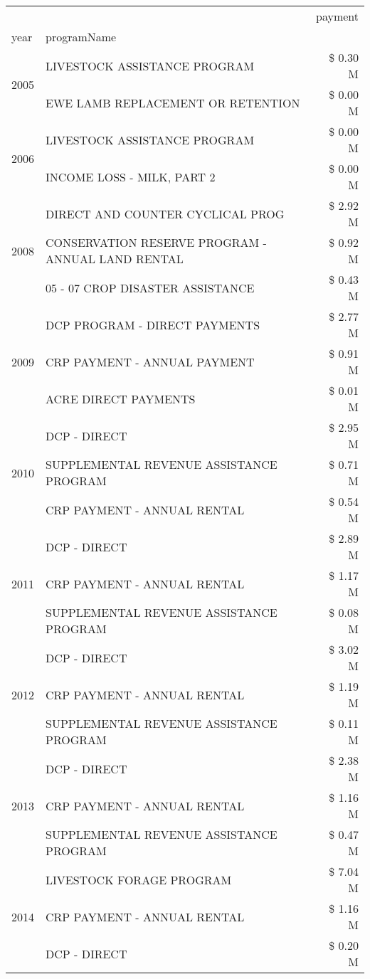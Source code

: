 \begin{tabular}{llr}
\toprule
 &  & payment \\
year & programName &  \\
\midrule
\multirow[t]{2}{*}{2005} & LIVESTOCK ASSISTANCE PROGRAM & \$ 0.30 M \\
 & EWE LAMB REPLACEMENT OR RETENTION & \$ 0.00 M \\
\cline{1-3}
\multirow[t]{2}{*}{2006} & LIVESTOCK ASSISTANCE PROGRAM & \$ 0.00 M \\
 & INCOME LOSS - MILK, PART 2 & \$ 0.00 M \\
\cline{1-3}
\multirow[t]{3}{*}{2008} & DIRECT AND COUNTER CYCLICAL PROG & \$ 2.92 M \\
 & CONSERVATION RESERVE PROGRAM - ANNUAL LAND RENTAL & \$ 0.92 M \\
 & 05 - 07 CROP DISASTER ASSISTANCE & \$ 0.43 M \\
\cline{1-3}
\multirow[t]{3}{*}{2009} & DCP PROGRAM - DIRECT PAYMENTS & \$ 2.77 M \\
 & CRP PAYMENT - ANNUAL PAYMENT & \$ 0.91 M \\
 & ACRE DIRECT PAYMENTS & \$ 0.01 M \\
\cline{1-3}
\multirow[t]{3}{*}{2010} & DCP - DIRECT & \$ 2.95 M \\
 & SUPPLEMENTAL REVENUE ASSISTANCE PROGRAM & \$ 0.71 M \\
 & CRP PAYMENT - ANNUAL RENTAL & \$ 0.54 M \\
\cline{1-3}
\multirow[t]{3}{*}{2011} & DCP - DIRECT & \$ 2.89 M \\
 & CRP PAYMENT - ANNUAL RENTAL & \$ 1.17 M \\
 & SUPPLEMENTAL REVENUE ASSISTANCE PROGRAM & \$ 0.08 M \\
\cline{1-3}
\multirow[t]{3}{*}{2012} & DCP - DIRECT & \$ 3.02 M \\
 & CRP PAYMENT - ANNUAL RENTAL & \$ 1.19 M \\
 & SUPPLEMENTAL REVENUE ASSISTANCE PROGRAM & \$ 0.11 M \\
\cline{1-3}
\multirow[t]{3}{*}{2013} & DCP - DIRECT & \$ 2.38 M \\
 & CRP PAYMENT - ANNUAL RENTAL & \$ 1.16 M \\
 & SUPPLEMENTAL REVENUE ASSISTANCE PROGRAM & \$ 0.47 M \\
\cline{1-3}
\multirow[t]{3}{*}{2014} & LIVESTOCK FORAGE PROGRAM & \$ 7.04 M \\
 & CRP PAYMENT - ANNUAL RENTAL & \$ 1.16 M \\
 & DCP - DIRECT & \$ 0.20 M \\

\end{tabular}
